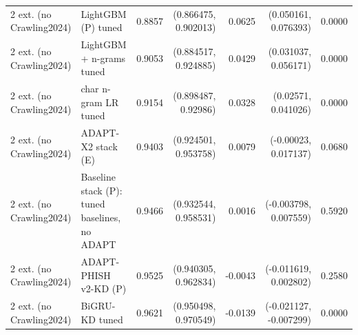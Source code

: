 \begin{table}[t]
\begin{tabular}{llrrrrr}
2 ext. (no Crawling2024) & LightGBM (P) tuned & 0.8857 & (0.866475, 0.902013) & 0.0625 & (0.050161, 0.076393) & 0.0000 \\
2 ext. (no Crawling2024) & LightGBM + n-grams tuned & 0.9053 & (0.884517, 0.924885) & 0.0429 & (0.031037, 0.056171) & 0.0000 \\
2 ext. (no Crawling2024) & char n-gram LR tuned & 0.9154 & (0.898487, 0.92986) & 0.0328 & (0.02571, 0.041026) & 0.0000 \\
2 ext. (no Crawling2024) & ADAPT-X2 stack (E) & 0.9403 & (0.924501, 0.953758) & 0.0079 & (-0.00023, 0.017137) & 0.0680 \\
2 ext. (no Crawling2024) & Baseline stack (P): tuned baselines, no ADAPT & 0.9466 & (0.932544, 0.958531) & 0.0016 & (-0.003798, 0.007559) & 0.5920 \\
2 ext. (no Crawling2024) & ADAPT-PHISH v2-KD (P) & 0.9525 & (0.940305, 0.962834) & -0.0043 & (-0.011619, 0.002802) & 0.2580 \\
2 ext. (no Crawling2024) & BiGRU-KD tuned & 0.9621 & (0.950498, 0.970549) & -0.0139 & (-0.021127, -0.007299) & 0.0000 \\
\bottomrule
\end{tabular}
\end{table}